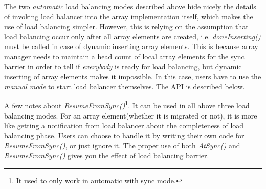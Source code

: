 The two {\em automatic} load balancing modes described above hide nicely
the details of invoking load balancer into the array implementation itself,
which makes the use of load balancing simpler. 
However, this is relying on the assumption that load balancing occur only
after all array elements are created, i.e. {\em doneInserting()} 
must be called in case of dynamic inserting array elements. 
This is because array manager needs to maintain a head count of 
local array elements for the sync barrier
in order to tell if {\it everybody} is ready for load balancing, but
 dynamic inserting of array elements makes it impossible. In this case,
users have to use the {\em manual mode} to start load balancer themselves.
The API is described below.

A few notes about {\em ResumeFromSync()}\footnote{It used to 
only work in automatic with sync mode.}. It can be used in all above three
load balancing modes. For an array element(whether it is migrated or not), 
it is more like getting a notification from load
balancer about the completeness of load balancing phase.
Users can choose to handle it by writing their own
code for {\em ResumeFromSync()}, or just ignore it. The proper use of both 
{\em AtSync()} and {\em ResumeFromSync()} gives you the effect of 
load balancing barrier. 

